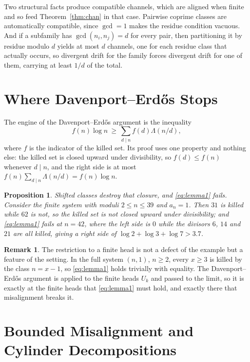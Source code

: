 \documentclass[11pt]{article}
\theoremstyle{plain}
\newtheorem{proposition}[theorem]{Proposition}
\theoremstyle{definition}
\newtheorem{remark}[theorem]{Remark}
\begin{document}
Two structural facts produce compatible channels, which are
aligned when finite and so feed Theorem~\ref{thm:chan} in that
case.  Pairwise
coprime classes are automatically compatible, since $\gcd=1$
makes the residue condition vacuous.  And if a subfamily has
$\gcd(n_i,n_j)=d$ for every pair, then partitioning it by
residue modulo $d$ yields at most $d$ channels, one for each
residue class that actually occurs, so divergent drift for the
family forces divergent drift for one of them, carrying at least
$1/d$ of the total.

\section{Where Davenport--Erd\H{o}s Stops}\label{sec:destop}

The engine of the Davenport--Erd\H{o}s argument
\cite{DE1936} is the inequality
\begin{equation}\label{eq:lemma1}
  f(n)\log n\ \ge\ \sum_{d\mid n} f(d)\Lambda(n/d),
\end{equation}
where $f$ is the indicator of the killed set.  Its proof uses
one property and nothing else: the killed set is closed upward
under divisibility, so $f(d)\le f(n)$ whenever $d\mid n$, and
the right side is at most $f(n)\sum_{d\mid n}\Lambda(n/d)=f(n)\log n$.

\begin{proposition}\label{prop:break}
Shifted classes destroy that closure, and \eqref{eq:lemma1}
fails.  Consider the finite system with moduli
$2\le n\le 39$ and $a_n=1$.  Then $31$ is killed while $62$ is
not, so the killed set is not closed upward under divisibility;
and \eqref{eq:lemma1} fails at $n=42$, where the left side is
$0$ while the divisors $6$, $14$ and $21$ are all killed, giving
a right side of $\log 2+\log 3+\log 7>3.7$.
\end{proposition}

\begin{remark}
The restriction to a finite head is not a defect of the example
but a feature of the setting.  In the full system $(n,1)$,
$n\ge2$, every $x\ge3$ is killed by the class $n=x-1$, so
\eqref{eq:lemma1} holds trivially with equality.  The
Davenport--Erd\H{o}s argument is applied to the finite heads
$U_k$ and passed to the limit, so it is exactly at the finite
heads that \eqref{eq:lemma1} must hold, and exactly there that
misalignment breaks it.
\end{remark}

\section{Bounded Misalignment and Cylinder Decompositions}\label{sec:cyl}
\end{document}
